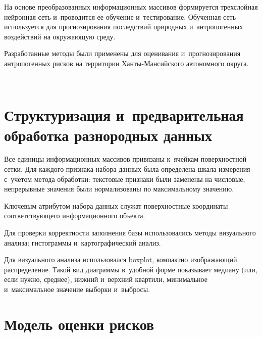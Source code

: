 \begin{multicols}{2}
  На основе преобразованных информационных массивов формируется 
трехслойная нейронная сеть и~проводится ее обучение и~тестирование. 
Обученная сеть используется для прогнозирования последствий природных 
и~антропогенных воздействий на окружающую среду. 
  
  Разработанные методы были применены для оценивания и~прогнозирования 
антропогенных рисков на территории Хан\-ты-Ман\-сий\-ско\-го автономного 
округа.

\begin{figure*}[b] %
    \begin{center}  
  \mbox{%
 \epsfxsize=165.986mm 
 }
\end{center}
\vspace*{-9pt}
\end{figure*}
  

\vspace*{-12pt}
  
\section{Структуризация и~предварительная обработка разнородных 
данных}

\vspace*{-4pt}

  Все единицы информационных массивов привязаны к~ячейкам 
поверхностной сетки. Для каждого признака набора данных была определена 
шкала измерения с~учетом метода обработки: текстовые признаки были 
заменены на числовые, непрерывные значения были нормализованы по 
максимальному значению.
  
  Ключевым атрибутом набора данных служат поверхностные координаты 
соответствующего информационного объекта.
  
  Для проверки корректности заполнения базы использовались методы 
визуального анализа: гистограммы и~картографический анализ.
  
  Для визуального анализа использовался boxplot, компактно изображающий 
распределение. Такой вид диаграммы в~удобной форме показывает медиану 
(или, если нужно, среднее), нижний и~верхний квартили, минимальное 
и~максимальное значение выборки и~выбросы.

\vspace*{-6pt}
  
\section{Модель оценки рисков}


\end{multicols}
